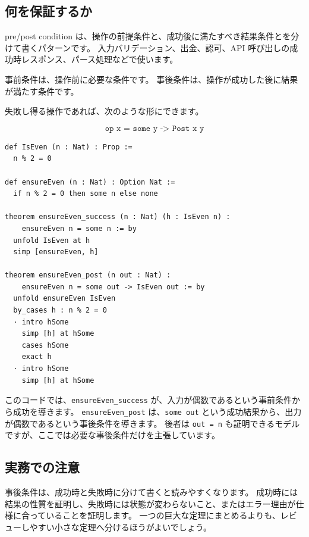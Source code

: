 \subsection{何を保証するか}

pre/post condition は、操作の前提条件と、成功後に満たすべき結果条件とを分けて書くパターンです。
入力バリデーション、出金、認可、API 呼び出しの成功時レスポンス、パース処理などで使います。

事前条件は、操作前に必要な条件です。
事後条件は、操作が成功した後に結果が満たす条件です。

失敗し得る操作であれば、次のような形にできます。

\[
\texttt{op x = some y -> Post x y}
\]

\begin{listing}[htbp]
\begin{verbatim}
def IsEven (n : Nat) : Prop :=
  n % 2 = 0

def ensureEven (n : Nat) : Option Nat :=
  if n % 2 = 0 then some n else none

theorem ensureEven_success (n : Nat) (h : IsEven n) :
    ensureEven n = some n := by
  unfold IsEven at h
  simp [ensureEven, h]

theorem ensureEven_post (n out : Nat) :
    ensureEven n = some out -> IsEven out := by
  unfold ensureEven IsEven
  by_cases h : n % 2 = 0
  · intro hSome
    simp [h] at hSome
    cases hSome
    exact h
  · intro hSome
    simp [h] at hSome
\end{verbatim}
\caption{\texttt{ensureEven\_success}・\texttt{ensureEven\_post}}
\label{lst:appc_pre_post_condition}
\end{listing}

このコードでは、\texttt{ensureEven\_success} が、入力が偶数であるという事前条件から成功を導きます。
\texttt{ensureEven\_post} は、\texttt{some out} という成功結果から、出力が偶数であるという事後条件を導きます。
後者は \texttt{out = n} も証明できるモデルですが、ここでは必要な事後条件だけを主張しています。

\subsection{実務での注意}

事後条件は、成功時と失敗時に分けて書くと読みやすくなります。
成功時には結果の性質を証明し、失敗時には状態が変わらないこと、またはエラー理由が仕様に合っていることを証明します。
一つの巨大な定理にまとめるよりも、レビューしやすい小さな定理へ分けるほうがよいでしょう。

